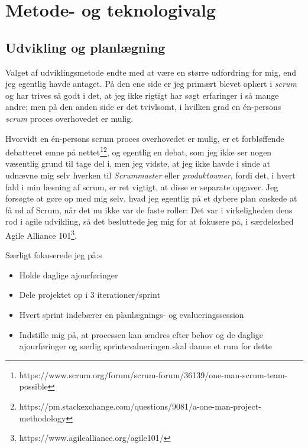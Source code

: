 \documentclass{report}
\begin{document}


\chapter{Metode- og teknologivalg}

\section{Udvikling og planlægning}
Valget af udviklingsmetode endte med at være en større udfordring for mig, end jeg egentlig havde antaget. På den ene side er jeg primært blevet oplært i \textit{scrum} og har trives så godt i det, at jeg ikke rigtigt har søgt erfaringer i så mange andre; men på den anden side er det tvivlsomt, i hvilken grad en én-persons \textit{scrum} proces overhovedet er mulig.\par{}
Hvorvidt en én-persons scrum proces overhovedet er mulig, er et forbløffende debatteret emne på nettet\footnote{https://www.scrum.org/forum/scrum-forum/36139/one-man-scrum-team-possible}\footnote{https://pm.stackexchange.com/questions/9081/a-one-man-project-methodology}, og egentlig en debat, som jeg  ikke ser nogen væsentlig grund til tage del i, men jeg vidste, at jeg ikke havde i sinde at udnævne mig selv hverken til \textit{Scrummaster} eller \textit{produktowner}, fordi det, i hvert fald i min læsning af scrum, er ret vigtigt, at disse er separate opgaver. Jeg forsøgte at gøre op med mig selv, hvad jeg egentlig på et dybere plan ønskede at få ud af Scrum, når det nu ikke var de faste roller: Det var i virkeligheden dens rod i agile udvikling, så det besluttede jeg mig for at fokusere på, i særdeleshed Agile Alliance 101\footnote{https://www.agilealliance.org/agile101/}.\par{}

Særligt fokuserede jeg på:s
\begin{itemize}
\item Holde daglige ajourføringer
\item Dele projektet op i 3 iterationer/sprint
\item Hvert sprint indebærer en planlægnings- og evalueringssession
\item Indstille mig på, at processen kan ændres efter behov og de daglige ajourføringer og særlig sprintevalueringen skal danne et rum for dette
\end{itemize}
\end{document}
